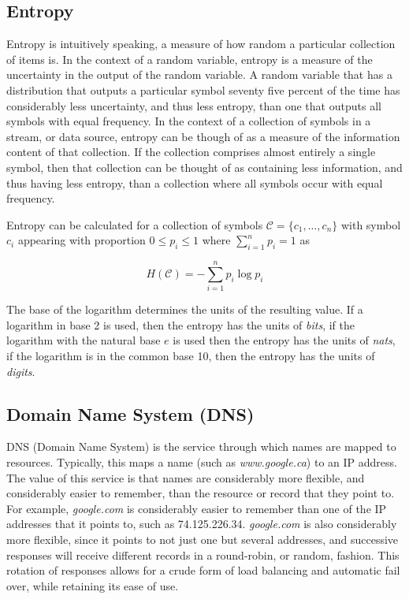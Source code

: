 \documentclass[12pt]{article}
\theoremstyle{remark}
\theoremstyle{definition}
\theoremstyle{definition}
\theoremstyle{definition}
\begin{document}
\subsection{Entropy}
Entropy is intuitively speaking, a measure of how random a particular collection
of items is. In the context of a random variable, entropy is a measure of the
uncertainty in the output of the random variable. A random variable that has a
distribution that outputs a particular symbol seventy five percent of the time
has considerably less uncertainty, and thus less entropy, than one that outputs
all symbols with equal frequency. In the context of a collection of symbols in a
stream, or data source, entropy can be though of as a measure of the information
content of that collection. If the collection comprises almost entirely a single
symbol, then that collection can be thought of as containing less information,
and thus having less entropy, than a collection where all symbols occur with
equal frequency.

Entropy can be calculated for a collection of symbols
$\mathcal{C}=\{c_1,\ldots,c_n\}$ with symbol $c_i$ appearing with proportion
$0\leq p_i\leq 1$ where $\sum_{i=1}^n{p_i}=1$ as

 \[H(\mathcal{C})=-\sum_{i=1}^n{p_i \log{p_i}}\]

The base of the logarithm determines the units of the resulting value. If a
logarithm in base 2 is used, then the entropy has the units of \emph{bits}, if
the logarithm with the natural base $e$ is used then the entropy has the units
of \emph{nats}, if the logarithm is in the common base 10, then the entropy has
the units of \emph{digits}.

\subsection{Domain Name System (DNS)}

DNS (Domain Name System) is the service through which names are mapped to
resources. Typically, this maps a name (such as \emph{www.google.ca}) to an IP
address. The value of this service is that names are considerably more
flexible, and considerably easier to remember, than the resource or record that
they point to. For example, \emph{google.com} is considerably
easier to remember than one of the IP addresses that it points to, such as
74.125.226.34. \emph{google.com} is also considerably more flexible, since it
points to not just one but several addresses, and successive responses
will receive different records in a round-robin, or random, fashion. This
rotation of responses allows for a crude form of load balancing and automatic
fail over, while retaining its ease of use.
\end{document}
